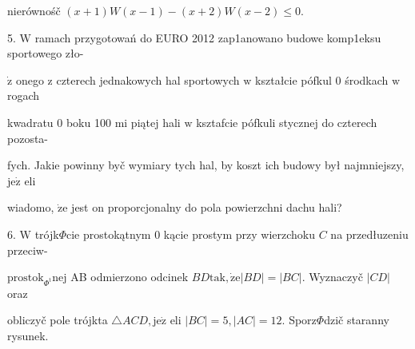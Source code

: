 \documentclass[a4paper,12pt]{article}
\begin{document}
nierównośč $(x+1)W(x-1)-(x+2)W(x-2)\leq 0.$

5. $\mathrm{W}$ ramach przygotowań do EURO 2012 zap1anowano budowe komp1eksu sportowego zło-

$\dot{\mathrm{z}}$ onego $\mathrm{z}$ czterech jednakowych hal sportowych $\mathrm{w}$ kształcie pófkul $0$ środkach $\mathrm{w}$ rogach

kwadratu $0$ boku 100 $\mathrm{m}\mathrm{i}$ piątej hali $\mathrm{w}$ ksztafcie pófkuli stycznej do czterech pozosta-

fych. Jakie powinny byč wymiary tych hal, by koszt ich budowy był najmniejszy, $\mathrm{j}\mathrm{e}\dot{\mathrm{z}}$ eli

wiadomo, $\dot{\mathrm{z}}\mathrm{e}$ jest on proporcjonalny do pola powierzchni dachu hali?

6. $\mathrm{W}$ trójk$\Phi$cie prostokątnym $0$ kącie prostym przy wierzchoku $C$ na przedłuzeniu przeciw-

$\mathrm{p}\mathrm{r}\mathrm{o}\mathrm{s}\mathrm{t}\mathrm{o}\mathrm{k}_{\Phi^{\mathrm{t}}}\mathrm{n}\mathrm{e}\mathrm{j}$ AB odmierzono odcinek $BD\mathrm{t}\mathrm{a}\mathrm{k}, \dot{\mathrm{z}}\mathrm{e}|BD|=|BC|$. Wyznaczyč $|CD|$ oraz

obliczyč pole trójkta $\triangle ACD, \mathrm{j}\mathrm{e}\dot{\mathrm{z}}$ eli $|BC|=5, |AC|=12$. Sporz$\Phi$dzič staranny rysunek.
\end{document}
